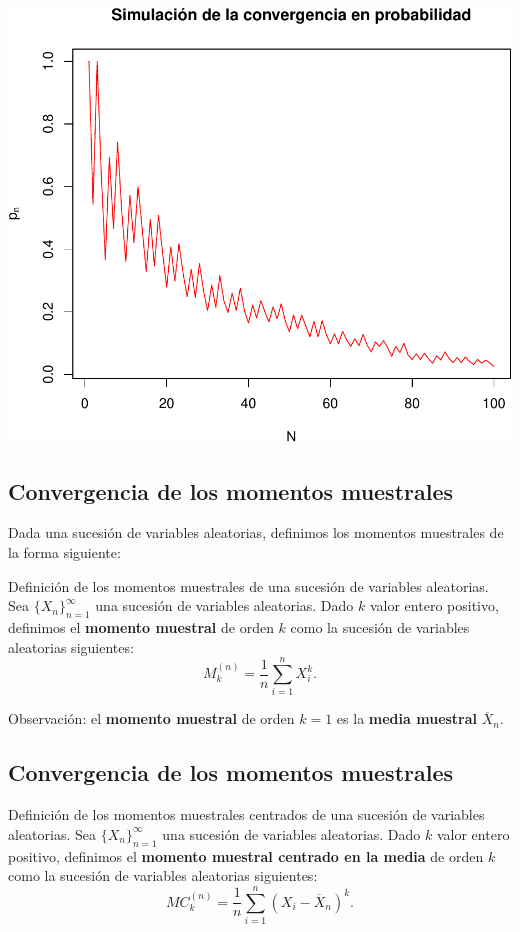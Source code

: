 \documentclass[]{book}
\begin{document}
\includegraphics{curso-probabilidad-udemy_files/figure-latex/unnamed-chunk-178-1.pdf}

\hypertarget{convergencia-de-los-momentos-muestrales}{%
\subsection{Convergencia de los momentos muestrales}\label{convergencia-de-los-momentos-muestrales}}

Dada una sucesión de variables aleatorias, definimos los momentos muestrales de la forma siguiente:

 Definición de los momentos muestrales de una sucesión de variables aleatorias.
Sea \(\{X_n\}_{n=1}^\infty\) una sucesión de variables aleatorias. Dado \(k\) valor entero positivo, definimos el \textbf{momento muestral} de orden \(k\) como la sucesión de variables aleatorias siguientes:
\[
M_k^{(n)} = \frac{1}{n}\sum_{i=1}^n X_i^k.
\]

 Observación:
el \textbf{momento muestral} de orden \(k=1\) es la \textbf{media muestral} \(\overline{X}_n\).

\hypertarget{convergencia-de-los-momentos-muestrales-1}{%
\subsection{Convergencia de los momentos muestrales}\label{convergencia-de-los-momentos-muestrales-1}}

 Definición de los momentos muestrales centrados de una sucesión de variables aleatorias.
Sea \(\{X_n\}_{n=1}^\infty\) una sucesión de variables aleatorias. Dado \(k\) valor entero positivo, definimos el \textbf{momento muestral centrado en la media} de orden \(k\) como la sucesión de variables aleatorias siguientes:
\[
MC_k^{(n)} = \frac{1}{n}\sum_{i=1}^n (X_i-\overline{X}_n)^k.
\]
\end{document}
